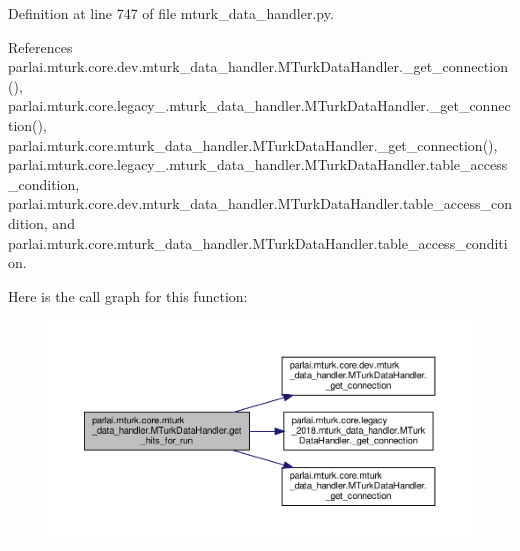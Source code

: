 Definition at line 747 of file mturk\+\_\+data\+\_\+handler.\+py.



References parlai.\+mturk.\+core.\+dev.\+mturk\+\_\+data\+\_\+handler.\+M\+Turk\+Data\+Handler.\+\_\+get\+\_\+connection(), parlai.\+mturk.\+core.\+legacy\+\_.\+mturk\+\_\+data\+\_\+handler.\+M\+Turk\+Data\+Handler.\+\_\+get\+\_\+connection(), parlai.\+mturk.\+core.\+mturk\+\_\+data\+\_\+handler.\+M\+Turk\+Data\+Handler.\+\_\+get\+\_\+connection(), parlai.\+mturk.\+core.\+legacy\+\_.\+mturk\+\_\+data\+\_\+handler.\+M\+Turk\+Data\+Handler.\+table\+\_\+access\+\_\+condition, parlai.\+mturk.\+core.\+dev.\+mturk\+\_\+data\+\_\+handler.\+M\+Turk\+Data\+Handler.\+table\+\_\+access\+\_\+condition, and parlai.\+mturk.\+core.\+mturk\+\_\+data\+\_\+handler.\+M\+Turk\+Data\+Handler.\+table\+\_\+access\+\_\+condition.

Here is the call graph for this function\+:
\nopagebreak
\begin{figure}[H]
\begin{center}
\leavevmode
\includegraphics[width=350pt]{classparlai_1_1mturk_1_1core_1_1mturk__data__handler_1_1MTurkDataHandler_a9f4e9c9bec7d5d47efd4492dfb751b5c_cgraph}
\end{center}
\end{figure}
\mbox{\label{classparlai_1_1mturk_1_1core_1_1mturk__data__handler_1_1MTurkDataHandler_a092a03e29a20f0b40b9d33e1e002395a}} 
